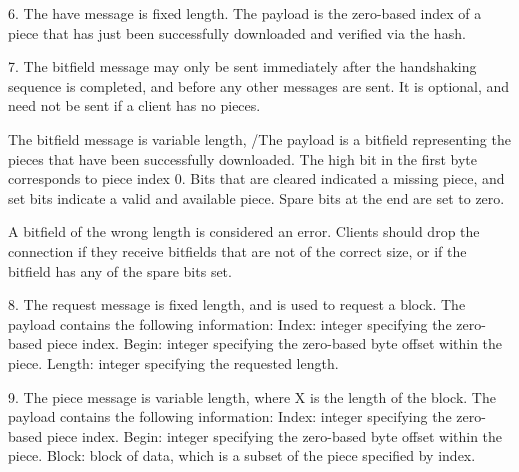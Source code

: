 \documentclass[11pt]{article}
\begin{document}
  \begin{flushleft}

    6. The have message is fixed length. The payload is the zero-based index of a piece that has just been successfully downloaded and verified via the hash.

  \end{flushleft}
  \begin{flushleft}


    7. The bitfield message may only be sent immediately after the handshaking sequence is completed, and before any other messages are sent. It is optional, and need not be sent if a client has no pieces.

  \end{flushleft}
  \begin{flushleft}

    The bitfield message is variable length, /The payload is a bitfield representing the pieces that have been successfully downloaded. The high bit in the first byte corresponds to piece index 0. Bits that are cleared indicated a missing piece, and set bits indicate a valid and available piece. Spare bits at the end are set to zero.

  \end{flushleft}
  \begin{flushleft}

    A bitfield of the wrong length is considered an error. Clients should drop the connection if they receive bitfields that are not of the correct size, or if the bitfield has any of the spare bits set.

  \end{flushleft}
  \begin{flushleft}

    8. The request message is fixed length, and is used to request a block. The payload contains the following information: Index: integer specifying the zero-based piece index. Begin: integer specifying the zero-based byte offset within the piece. Length: integer specifying the requested length.

  \end{flushleft}
  \begin{flushleft}

    9. The piece message is variable length, where X is the length of the block. The payload contains the following information: Index: integer specifying the zero-based piece index. Begin: integer specifying the zero-based byte offset within the piece. Block: block of data, which is a subset of the piece specified by index.

  \end{flushleft}
\end{document}
